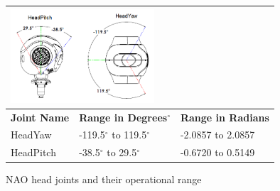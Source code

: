\begin{figure}
\begin{tabular}{|p{5cm}|p{5cm}|p{5cm}|}
\multicolumn{3}{p{15cm}}{\centering \includegraphics[height = 3.5cm]{Figures/headjoints.png}} \\ \hline
\textbf{Joint Name} & \textbf{Range in Degrees$^{\circ}$} & \textbf{Range in Radians} \\ \hline
HeadYaw & -119.5$^{\circ}$ to 119.5$^{\circ}$ & -2.0857 to 2.0857 \\ \hline
HeadPitch & -38.5$^{\circ}$ to 29.5$^{\circ}$ & -0.6720 to 0.5149 \\ \hline
\end{tabular}
\caption{NAO head joints and their operational range}
\label{fig:hjoints}
\end{figure}

